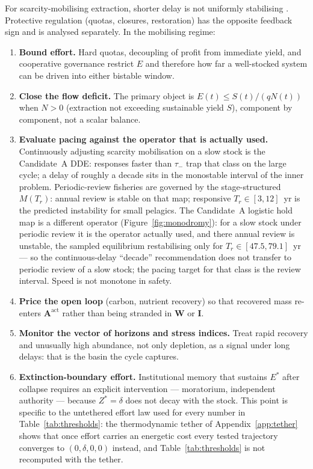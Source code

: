 \documentclass[11pt]{article}
\theoremstyle{definition}
\begin{document}
For scarcity-mobilising extraction, shorter delay is not uniformly stabilising \cite{hocherman2025,mckibbin2014}. Protective regulation (quotas, closures, restoration) has the opposite feedback sign and is analysed separately. In the mobilising regime:

\begin{enumerate}
\item \textbf{Bound effort.} Hard quotas, decoupling of profit from immediate yield, and cooperative governance \cite{ostrom1990} restrict $E$ and therefore how far a well-stocked system can be driven into either bistable window.
\item \textbf{Close the flow deficit.} The primary object is $E(t)\le S(t)/(qN(t))$ when $N>0$ (extraction not exceeding sustainable yield $S$), component by component, not a scalar balance.
\item \textbf{Evaluate pacing against the operator that is actually used.} Continuously adjusting scarcity mobilisation on a slow stock is the Candidate~A DDE: responses faster than $\tau_-$ trap that class on the large cycle; a delay of roughly a decade sits in the monostable interval of the inner problem. Periodic-review fisheries are governed by the stage-structured $M(T_r)$: annual review is stable on that map; responsive $T_r\in[3,12]$~yr is the predicted instability for small pelagics. The Candidate~A logistic hold map is a different operator (Figure~\ref{fig:monodromy}): for a slow stock under periodic review it is the operator actually used, and there annual review is unstable, the sampled equilibrium restabilising only for $T_r\in[47.5,79.1]$~yr --- so the continuous-delay ``decade'' recommendation does not transfer to periodic review of a slow stock; the pacing target for that class is the review interval. Speed is not monotone in safety.
\item \textbf{Price the open loop} (carbon, nutrient recovery) so that recovered mass re-enters $\mathbf A^{\mathrm{act}}$ rather than being stranded in $\mathbf W$ or $\mathbf I$.
\item \textbf{Monitor the vector of horizons and stress indices.} Treat rapid recovery and unusually high abundance, not only depletion, as a signal under long delays: that is the basin the cycle captures.
\item \textbf{Extinction-boundary effort.} Institutional memory that sustains $E^*$ after collapse requires an explicit intervention --- moratorium, independent authority --- because $Z^*=\delta$ does not decay with the stock. This point is specific to the untethered effort law used for every number in Table~\ref{tab:thresholds}: the thermodynamic tether of Appendix~\ref{app:tether} shows that once effort carries an energetic cost every tested trajectory converges to $(0,\delta,0,0)$ instead, and Table~\ref{tab:thresholds} is not recomputed with the tether.
\end{enumerate}
\end{document}
